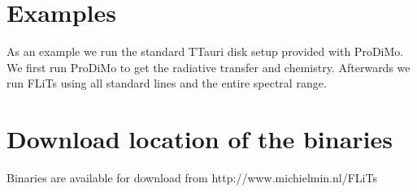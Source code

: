 \documentclass[12pt]{article}
\begin{document}
\section{Examples}

As an example we run the standard TTauri disk setup provided with ProDiMo. We first run ProDiMo to get the radiative transfer and chemistry. Afterwards we run FLiTs using all standard lines and the entire spectral range.

\section{Download location of the binaries}

Binaries are available for download from http://www.michielmin.nl/FLiTs
\end{document}
